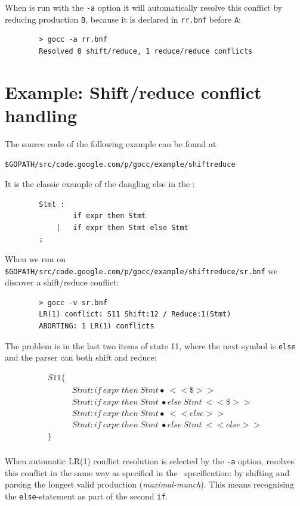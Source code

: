 \documentclass[12pt]{article}
\begin{document}
	When \gocc is run with the \verb|-a| option it will automatically resolve this conflict by reducing production \verb|B|, because it is declared in \verb|rr.bnf| before \verb|A|:

	\begin{verbatim}
		> gocc -a rr.bnf
		Resolved 0 shift/reduce, 1 reduce/reduce conflicts
	\end{verbatim}

\section{Example: Shift/reduce conflict handling} \label{sec:example sr}
	The source code of the following example can be found at

	\verb|$GOPATH/src/code.google.com/p/gocc/example/shiftreduce|

	It is the classic example of the dangling else in the \Clang:

	\begin{verbatim}
		Stmt :
		        if expr then Stmt
		    |   if expr then Stmt else Stmt
		;
	\end{verbatim}

	When we run \gocc on \verb|$GOPATH/src/code.google.com/p/gocc/example/shiftreduce/sr.bnf| we discover a shift/reduce conflict:

	\begin{verbatim}
		> gocc -v sr.bnf
		LR(1) conflict: S11 Shift:12 / Reduce:1(Stmt)
		ABORTING: 1 LR(1) conflicts
	\end{verbatim}

	The problem is in the last two items of state 11, where the next symbol is \verb|else| and the parser can both shift and reduce:

	\[
		\begin{array}{ll}
			S11 \{ \\
			  & Stmt : if\ expr\ then\ Stmt\bullet\ <<\$>> \\
			  & Stmt : if\ expr\ then\ Stmt\ \bullet else\ Stmt\ <<\$>> \\
			  & Stmt : if\ expr\ then\ Stmt \bullet\ <<else>> \\
			  & Stmt : if\ expr\ then\ Stmt\ \bullet else\ Stmt\ <<else>> \\
			\} \\
		\end{array}
	\]

	When automatic LR(1) conflict resolution is selected by the \verb|-a| option, \gocc resolves this conflict in the same way as specified in the \Clang\ specification: by shifting and parsing the longest valid production ({\em maximal-munch}). This means recognising the \verb|else|-statement as part of the second \verb|if|.
\end{document}
